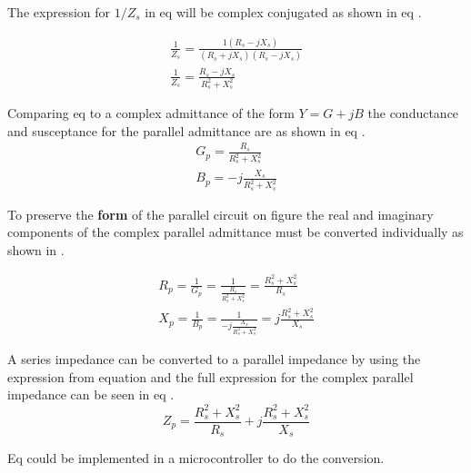The expression for $1/Z_s$ in eq  will be complex conjugated as shown in eq .

\begin{equation}\label{eq:4_1_5_ParallelModely2}
    \begin{split}
    \frac{1}{Z_s} = \frac{1(R_s - jX_s)}{(R_s + jX_s)(R_s - jX_s)}  \\
    \frac{1}{Z_s} = \frac{R_s - jX_s}{R_s^2+X_s^2} 
    \end{split}
\end{equation}

Comparing eq  to a complex admittance of the form $Y = G + jB$ the conductance and susceptance for the parallel admittance are as shown in eq .
\begin{equation}\label{eq:4_1_5_ParallelModely3}
    \begin{split}
    G_p = \frac{R_s}{R_s^2 + X_s^2} \\
    B_p = -j\frac{X_s}{R_s^2 + X_s^2}
    \end{split}
\end{equation}

To preserve the \textbf{form} of the parallel circuit on figure  the real and imaginary components of the complex parallel admittance must be converted individually as shown in .

\begin{equation}\label{eq:4_1_5_ParallelModely4}
    \begin{split}
    R_p = \frac{1}{G_p} = \frac{1}{\frac{R_s}{R_s^2 + X_s^2}} = \frac{R_s^2 + X_s^2}{R_s} \\
    X_p = \frac{1}{B_p} = \frac{1}{-j\frac{X_s}{R_s^2 + X_s^2}} = j\frac{R_s^2+X_s^2}{X_s}
    \end{split}
\end{equation}

A series impedance can be converted to a parallel impedance by using the expression from equation  and the full expression for the complex parallel impedance can be seen in eq .
\begin{equation}\label{eq:4_1_5_ParallelModely5}
       Z_p = \frac{R_s^2 + X_s^2}{R_s} + j\frac{R_s^2+X_s^2}{X_s} 
\end{equation}

Eq  could be implemented in a microcontroller to do the conversion.

